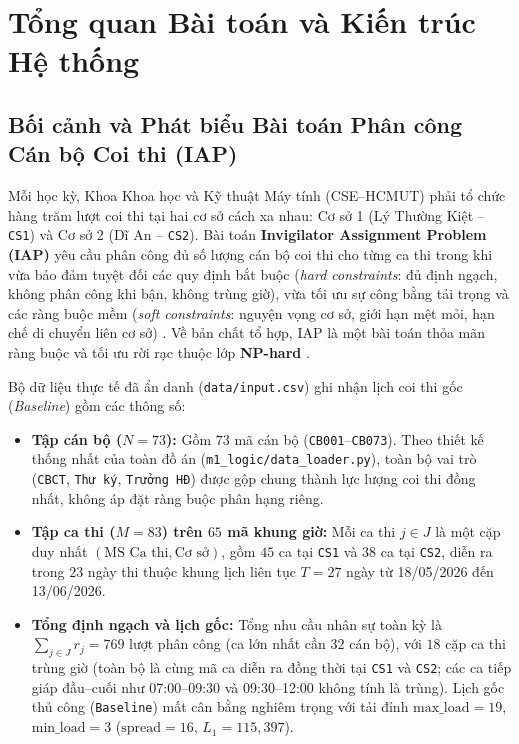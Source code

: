 \section{Tổng quan Bài toán và Kiến trúc Hệ thống}
\label{sec:overview}

\subsection{Bối cảnh và Phát biểu Bài toán Phân công Cán bộ Coi thi (IAP)}
Mỗi học kỳ, Khoa Khoa học và Kỹ thuật Máy tính (CSE--HCMUT) phải tổ chức hàng trăm lượt coi thi tại hai cơ sở cách xa nhau: Cơ sở 1 (Lý Thường Kiệt -- \texttt{CS1}) và Cơ sở 2 (Dĩ An -- \texttt{CS2}). Bài toán \textbf{Invigilator Assignment Problem (IAP)} yêu cầu phân công đủ số lượng cán bộ coi thi cho từng ca thi trong khi vừa bảo đảm tuyệt đối các quy định bắt buộc (\textit{hard constraints}: đủ định ngạch, không phân công khi bận, không trùng giờ), vừa tối ưu sự công bằng tải trọng và các ràng buộc mềm (\textit{soft constraints}: nguyện vọng cơ sở, giới hạn mệt mỏi, hạn chế di chuyển liên cơ sở) \cite{hanum2015,burke2004}. Về bản chất tổ hợp, IAP là một bài toán thỏa mãn ràng buộc và tối ưu rời rạc thuộc lớp \textbf{NP-hard} \cite{nemhauser1999}.

Bộ dữ liệu thực tế đã ẩn danh (\texttt{data/input.csv}) ghi nhận lịch coi thi gốc (\textit{Baseline}) gồm các thông số:
\begin{itemize}
    \item \textbf{Tập cán bộ ($N = 73$):} Gồm $73$ mã cán bộ (\texttt{CB001}--\texttt{CB073}). Theo thiết kế thống nhất của toàn đồ án (\texttt{m1\_\allowbreak logic/\allowbreak data\_\allowbreak loader.py}), toàn bộ vai trò (\texttt{CBCT}, \texttt{Thư ký}, \texttt{Trưởng HĐ}) được gộp chung thành lực lượng coi thi đồng nhất, không áp đặt ràng buộc phân hạng riêng.
    \item \textbf{Tập ca thi ($M = 83$) trên $65$ mã khung giờ:} Mỗi ca thi $j \in J$ là một cặp duy nhất $(\text{MS Ca thi}, \text{Cơ sở})$, gồm $45$ ca tại \texttt{CS1} và $38$ ca tại \texttt{CS2}, diễn ra trong $23$ ngày thi thuộc khung lịch liên tục $T = 27$ ngày từ 18/05/2026 đến 13/06/2026.
    \item \textbf{Tổng định ngạch và lịch gốc:} Tổng nhu cầu nhân sự toàn kỳ là $\sum_{j \in J} r_j = 769$ lượt phân công (ca lớn nhất cần $32$ cán bộ), với $18$ cặp ca thi trùng giờ (toàn bộ là cùng mã ca diễn ra đồng thời tại \texttt{CS1} và \texttt{CS2}; các ca tiếp giáp đầu--cuối như 07:00--09:30 và 09:30--12:00 không tính là trùng). Lịch gốc thủ công (\texttt{Baseline}) mất cân bằng nghiêm trọng với tải đỉnh $\text{max\_load} = 19$, $\text{min\_load} = 3$ ($\text{spread} = 16$, $L_1 = 115{,}397$).
\end{itemize}

